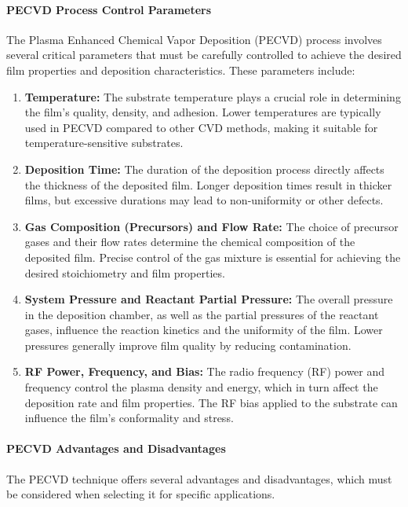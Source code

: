 \documentclass{report}
\begin{document}
\paragraph{PECVD Process Control Parameters}
The Plasma Enhanced Chemical Vapor Deposition (PECVD) process involves several critical parameters that must be carefully controlled to achieve the desired film properties and deposition characteristics. These parameters include:
\begin{enumerate}
    \item \textbf{Temperature:} The substrate temperature plays a crucial role in determining the film's quality, density, and adhesion. Lower temperatures are typically used in PECVD compared to other CVD methods, making it suitable for temperature-sensitive substrates.
    \item \textbf{Deposition Time:} The duration of the deposition process directly affects the thickness of the deposited film. Longer deposition times result in thicker films, but excessive durations may lead to non-uniformity or other defects.
    \item \textbf{Gas Composition (Precursors) and Flow Rate:} The choice of precursor gases and their flow rates determine the chemical composition of the deposited film. Precise control of the gas mixture is essential for achieving the desired stoichiometry and film properties.
    \item \textbf{System Pressure and Reactant Partial Pressure:} The overall pressure in the deposition chamber, as well as the partial pressures of the reactant gases, influence the reaction kinetics and the uniformity of the film. Lower pressures generally improve film quality by reducing contamination.
    \item \textbf{RF Power, Frequency, and Bias:} The radio frequency (RF) power and frequency control the plasma density and energy, which in turn affect the deposition rate and film properties. The RF bias applied to the substrate can influence the film's conformality and stress.
\end{enumerate}

\paragraph{PECVD Advantages and Disadvantages}
The PECVD technique offers several advantages and disadvantages, which must be considered when selecting it for specific applications.
\end{document}
